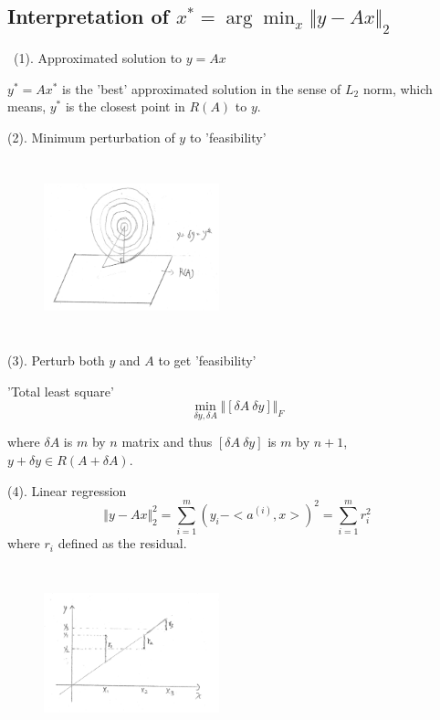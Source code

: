 

%









\subsection{Interpretation of $x^*= \arg \min_x \Vert y-Ax\Vert_2$}

\quad\ (1). Approximated solution to $y=Ax$

$y^*=Ax^*$ is the 'best' approximated solution in the sense of $L_2$ norm, which means, $y^*$ is the closest point in $R(A)$ to $y$.

(2). Minimum perturbation of $y$ to 'feasibility'

\begin{figure}
	\centering
	\includegraphics[width=2in,height=2in]{figures/ch06/ch06-01.jpg}
\end{figure}

(3). Perturb both $y$ and $A$ to get 'feasibility'

'Total least square'
$$\min_{\delta y,  \delta A} \Vert [\delta A\  \delta y] \Vert_F$$

where $\delta A$ is $m$ by $n$ matrix and thus $[\delta A\  \delta y]$ is $m$ by $n+1$, $y+\delta y\in R(A+\delta A)$.


(4). Linear regression
$$\Vert y-Ax\Vert ^2_2 = \sum_{i=1}^{m} ( y_i - <a^{(i)} , x>)^2 = \sum_{i=1}^{m} r_i^2$$
where $r_i$ defined as the residual.

\begin{figure}
	\centering
	\includegraphics[width=2in,height=2in]{figures/ch06/ch06-02.jpg}
\end{figure}



